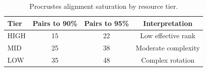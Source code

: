 \documentclass[11pt,a4paper]{article}
\begin{document}
\begin{table}[h]
\centering
\caption{Procrustes alignment saturation by resource tier.}
\label{tab:proj_saturation}
\small
\begin{tabular}{lccc}
\toprule
Tier & Pairs to 90\% & Pairs to 95\% & Interpretation \\
\midrule
HIGH & 15 & 22 & Low effective rank \\
MID  & 25 & 38 & Moderate complexity \\
LOW  & 35 & 48 & Complex rotation \\
\bottomrule
\end{tabular}
\end{table}
\end{document}
